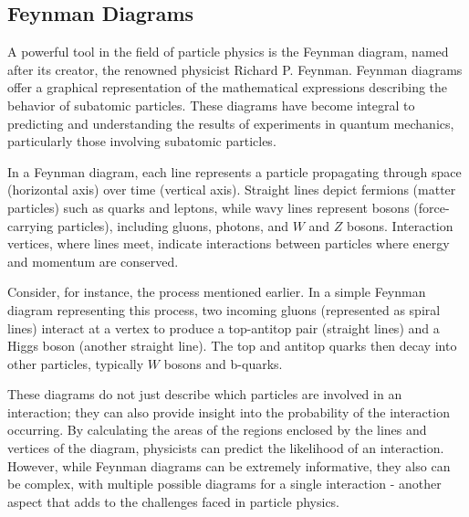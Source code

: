 \subsection{Feynman Diagrams}



A powerful tool in the field of particle physics is the Feynman diagram, named after its creator, the renowned physicist
Richard P. Feynman. Feynman diagrams offer a graphical representation of the mathematical expressions describing the
behavior of subatomic particles. These diagrams have become integral to predicting and understanding the results of
experiments in quantum mechanics, particularly those involving subatomic particles.

In a Feynman diagram, each line represents a particle propagating through space (horizontal axis) over time (vertical
axis). Straight lines depict fermions (matter particles) such as quarks and leptons, while wavy lines represent bosons
(force-carrying particles), including gluons, photons, and $W$ and $Z$ bosons. Interaction vertices, where lines meet,
indicate interactions between particles where energy and momentum are conserved.

Consider, for instance, the \tth process mentioned earlier. In a simple Feynman diagram representing this process, two
incoming gluons (represented as spiral lines) interact at a vertex to produce a top-antitop pair (straight lines) and a
Higgs boson (another straight line). The top and antitop quarks then decay into other particles, typically $W$ bosons and
b-quarks.

These diagrams do not just describe which particles are involved in an interaction; they can also provide insight into
the probability of the interaction occurring. By calculating the areas of the regions enclosed by the lines and vertices
of the diagram, physicists can predict the likelihood of an interaction. However, while Feynman diagrams can be
extremely informative, they also can be complex, with multiple possible diagrams for a single interaction - another
aspect that adds to the challenges faced in particle physics.